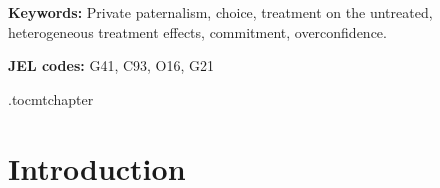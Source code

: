 \documentclass[11pt, a4paper]{article}
\begin{document}
\begin{abstract}

\end{abstract}


\textbf{Keywords: } Private paternalism, choice, treatment on the untreated, heterogeneous treatment effects, commitment, overconfidence.

\textbf{JEL codes:} G41, C93, O16, G21

\vspace{3.75in}


\etocdepthtag.toc{mtchapter}




\newpage
\section{Introduction}
\end{document}
